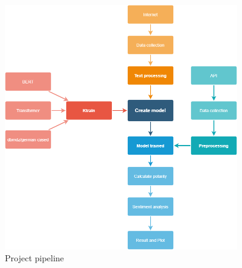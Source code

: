 \begin{figure}[ht!]
\centering
\includegraphics[width=0.9\textwidth]{images/test1.png}
\caption{Project pipeline}
\label{fig:fig_pipeline}
\end{figure}
\FloatBarrier